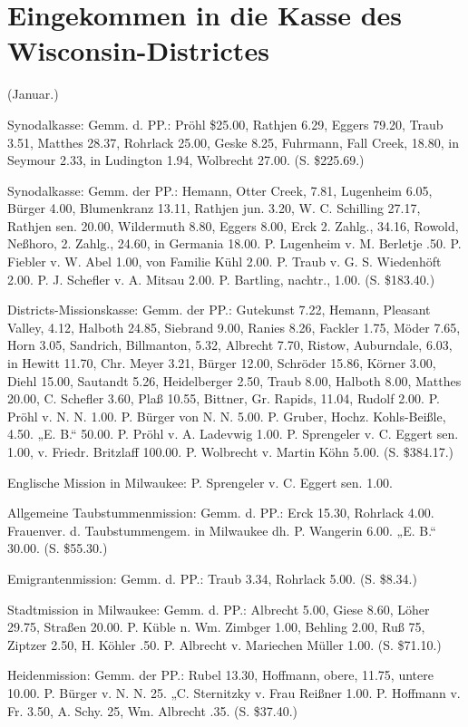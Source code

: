 \chapter[Kasse des Wisconsin-Districtes]{Eingekommen in die Kasse des Wisconsin-Districtes}

(Januar.)

Synodalkasse: Gemm. d. PP.: Pröhl \$25.00, Rathjen 6.29, Eggers 79.20, Traub 3.51, Matthes 28.37, Rohrlack 25.00, Geske 8.25, Fuhrmann, Fall Creek, 18.80, in Seymour 2.33, in Ludington 1.94, Wolbrecht 27.00. (S. \$225.69.)

Synodalkasse: Gemm. der PP.: Hemann, Otter Creek, 7.81, Lugenheim 6.05, Bürger 4.00, Blumenkranz 13.11, Rathjen jun. 3.20, W. C. Schilling 27.17, Rathjen sen. 20.00, Wildermuth 8.80, Eggers 8.00, Erck 2. Zahlg., 34.16, Rowold, Neßhoro, 2. Zahlg., 24.60, in Germania 18.00. P. Lugenheim v. M. Berletje .50. P. Fiebler v. W. Abel 1.00, von Familie Kühl 2.00. P. Traub v. G. S. Wiedenhöft 2.00. P. J. Schefler v. A. Mitsau 2.00. P. Bartling, nachtr., 1.00. (S. \$183.40.)

Districts-Missionskasse: Gemm. der PP.: Gutekunst 7.22, Hemann, Pleasant Valley, 4.12, Halboth 24.85, Siebrand 9.00, Ranies 8.26, Fackler 1.75, Möder 7.65, Horn 3.05, Sandrich, Billmanton, 5.32, Albrecht 7.70, Ristow, Auburndale, 6.03, in Hewitt 11.70, Chr. Meyer 3.21, Bürger 12.00, Schröder 15.86, Körner 3.00, Diehl 15.00, Sautandt 5.26, Heidelberger 2.50, Traub 8.00, Halboth 8.00, Matthes 20.00, C. Schefler 3.60, Plaß 10.55, Bittner, Gr. Rapids, 11.04, Rudolf 2.00. P. Pröhl v. N. N. 1.00. P. Bürger von N. N. 5.00. P. Gruber, Hochz. Kohls-Beißle, 4.50. „E. B.“ 50.00. P. Pröhl v. A. Ladevwig 1.00. P. Sprengeler v. C. Eggert sen. 1.00, v. Friedr. Britzlaff 100.00. P. Wolbrecht v. Martin Köhn 5.00. (S. \$384.17.)

Englische Mission in Milwaukee: P. Sprengeler v. C. Eggert sen. 1.00.

Allgemeine Taubstummenmission: Gemm. d. PP.: Erck 15.30, Rohrlack 4.00. Frauenver. d. Taubstummengem. in Milwaukee dh. P. Wangerin 6.00. „E. B.“ 30.00. (S. \$55.30.)

Emigrantenmission: Gemm. d. PP.: Traub 3.34, Rohrlack 5.00. (S. \$8.34.)

Stadtmission in Milwaukee: Gemm. d. PP.: Albrecht 5.00, Giese 8.60, Löher 29.75, Straßen 20.00. P. Küble n. Wm. Zimbger 1.00, Behling 2.00, Ruß 75, Ziptzer 2.50, H. Köhler .50. P. Albrecht v. Mariechen Müller 1.00. (S. \$71.10.)

Heidenmission: Gemm. der PP.: Rubel 13.30, Hoffmann, obere, 11.75, untere 10.00. P. Bürger v. N. N. 25. „C. Sternitzky v. Frau Reißner 1.00. P. Hoffmann v. Fr. 3.50, A. Schy. 25, Wm. Albrecht .35. (S. \$37.40.)

